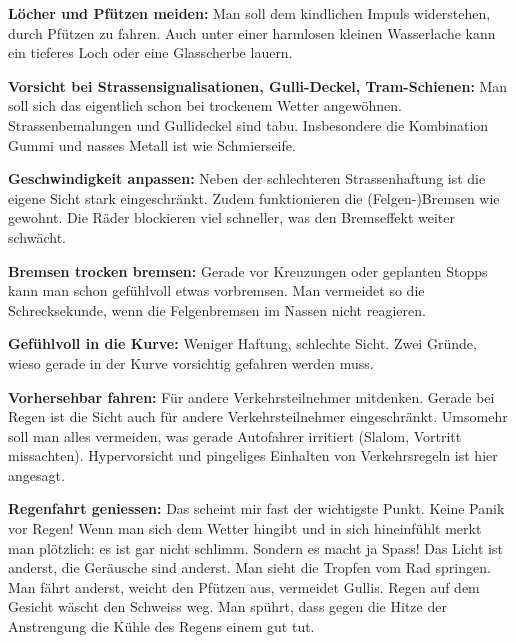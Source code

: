 \textbf{Löcher und Pfützen meiden:}
Man soll dem kindlichen Impuls widerstehen, durch Pfützen zu fahren.
Auch unter einer harmlosen kleinen Wasserlache kann ein tieferes Loch oder eine Glasscherbe lauern.

\textbf{Vorsicht bei Strassensignalisationen, Gulli-Deckel, Tram-Schienen:}
Man soll sich das eigentlich schon bei trockenem Wetter angewöhnen.
Strassenbemalungen und Gullideckel sind tabu.
Insbesondere die Kombination Gummi und nasses Metall ist wie Schmierseife.

\textbf{Geschwindigkeit anpassen:}
Neben der schlechteren Strassenhaftung ist die eigene Sicht stark eingeschränkt.
Zudem funktionieren die (Felgen-)Bremsen wie gewohnt.
Die Räder blockieren viel schneller, was den Bremseffekt weiter schwächt.

\textbf{Bremsen trocken bremsen:}
Gerade vor Kreuzungen oder geplanten Stopps kann man schon gefühlvoll etwas vorbremsen.
Man vermeidet so die Schrecksekunde, wenn die Felgenbremsen im Nassen nicht reagieren.

\textbf{Gefühlvoll in die Kurve:}
Weniger Haftung, schlechte Sicht.
Zwei Gründe, wieso gerade in der Kurve vorsichtig gefahren werden muss.

\textbf{Vorhersehbar fahren:}
Für andere Verkehrsteilnehmer mitdenken.
Gerade bei Regen ist die Sicht auch für andere Verkehrsteilnehmer eingeschränkt.
Umsomehr soll man alles vermeiden, was gerade Autofahrer irritiert (Slalom, Vortritt missachten).
Hypervorsicht und pingeliges Einhalten von Verkehrsregeln ist hier angesagt.

\textbf{Regenfahrt geniessen:}
Das scheint mir fast der wichtigste Punkt.
Keine Panik vor Regen!
Wenn man sich dem Wetter hingibt und in sich hineinfühlt merkt man plötzlich: es ist gar nicht schlimm.
Sondern es macht ja Spass!
Das Licht ist anderst, die Geräusche sind anderst. Man sieht die Tropfen vom Rad springen.
Man fährt anderst, weicht den Pfützen aus, vermeidet Gullis.
Regen auf dem Gesicht wäscht den Schweiss weg.
Man spührt, dass gegen die Hitze der Anstrengung die Kühle des Regens einem gut tut.

